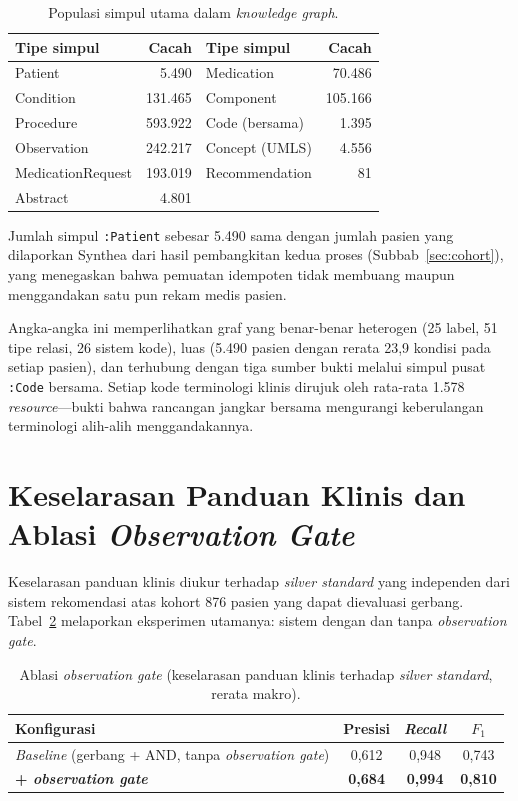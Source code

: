 \begin{table}[h]
\centering
\caption{Populasi simpul utama dalam \emph{knowledge graph}.}
\label{tab:graph-counts}
\begin{tabular}{lr@{\hskip 2cm}lr}
\hline
\textbf{Tipe simpul} & \textbf{Cacah} & \textbf{Tipe simpul} & \textbf{Cacah} \\
\hline
Patient          & 5.490   & Medication      & 70.486  \\
Condition        & 131.465 & Component       & 105.166 \\
Procedure        & 593.922 & Code (bersama)  & 1.395   \\
Observation      & 242.217 & Concept (UMLS)  & 4.556   \\
MedicationRequest& 193.019 & Recommendation  & 81      \\
Abstract         & 4.801   & & \\
\hline
\end{tabular}
\end{table}

Jumlah simpul \texttt{:Patient} sebesar 5.490 sama dengan jumlah pasien yang dilaporkan Synthea dari hasil
pembangkitan kedua proses (Subbab~\ref{sec:cohort}), yang menegaskan bahwa pemuatan
idempoten tidak membuang maupun menggandakan satu pun rekam medis pasien.

Angka-angka ini memperlihatkan graf yang benar-benar heterogen (25 label, 51 tipe relasi, 26
sistem kode), luas (5.490 pasien dengan rerata 23,9
kondisi pada setiap pasien), dan terhubung dengan tiga sumber bukti melalui simpul pusat
\texttt{:Code} bersama. Setiap kode terminologi klinis dirujuk oleh rata-rata
1.578 \emph{resource}---bukti bahwa rancangan jangkar bersama mengurangi
keberulangan terminologi alih-alih menggandakannya.

\section{Keselarasan Panduan Klinis dan Ablasi \emph{Observation Gate}}
\label{sec:ablation}

Keselarasan panduan klinis diukur terhadap \emph{silver standard} yang independen dari sistem
rekomendasi atas kohort 876 pasien yang dapat dievaluasi gerbang.
Tabel~\ref{tab:ablation} melaporkan eksperimen utamanya: sistem dengan dan tanpa
\emph{observation gate}.

\begin{table}[h]
\centering
\caption{Ablasi \emph{observation gate} (keselarasan panduan klinis terhadap \emph{silver standard},
rerata makro).}
\label{tab:ablation}
\begin{tabular}{lccc}
\hline
\textbf{Konfigurasi} & \textbf{Presisi} & \textbf{\emph{Recall}} & \textbf{$F_1$} \\
\hline
\emph{Baseline} (gerbang + AND, tanpa \emph{observation gate}) & 0,612 & 0,948 & 0,743 \\
\textbf{+ \emph{observation gate}} & \textbf{0,684} & \textbf{0,994} & \textbf{0,810} \\
\hline
\end{tabular}
\end{table}

